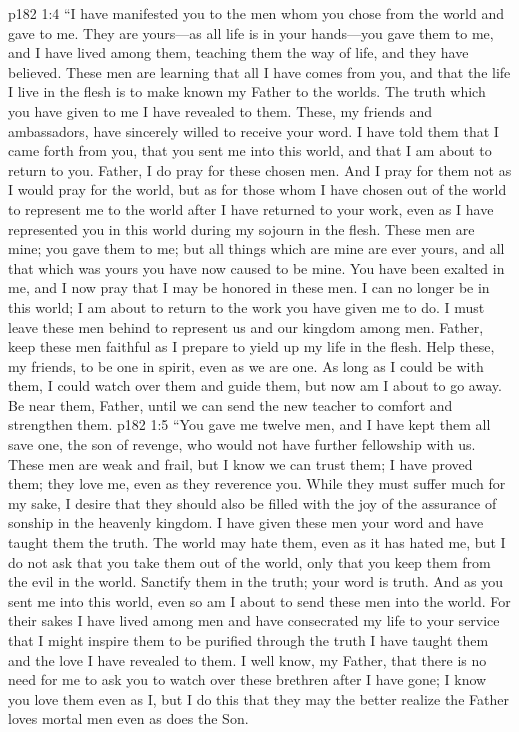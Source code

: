 \vs p182 1:4 \textcolor{ubdarkred}{“I have manifested you to the men whom you chose from the world and gave to me. They are yours---as all life is in your hands---you gave them to me, and I have lived among them, teaching them the way of life, and they have believed. These men are learning that all I have comes from you, and that the life I live in the flesh is to make known my Father to the worlds. The truth which you have given to me I have revealed to them. These, my friends and ambassadors, have sincerely willed to receive your word. I have told them that I came forth from you, that you sent me into this world, and that I am about to return to you. Father, I do pray for these chosen men. And I pray for them not as I would pray for the world, but as for those whom I have chosen out of the world to represent me to the world after I have returned to your work, even as I have represented you in this world during my sojourn in the flesh. These men are mine; you gave them to me; but all things which are mine are ever yours, and all that which was yours you have now caused to be mine. You have been exalted in me, and I now pray that I may be honored in these men. I can no longer be in this world; I am about to return to the work you have given me to do. I must leave these men behind to represent us and our kingdom among men. Father, keep these men faithful as I prepare to yield up my life in the flesh. Help these, my friends, to be one in spirit, even as we are one. As long as I could be with them, I could watch over them and guide them, but now am I about to go away. Be near them, Father, until we can send the new teacher to comfort and strengthen them.}\plusone
\vs p182 1:5 \textcolor{ubdarkred}{“You gave me twelve men, and I have kept them all save one, the son of revenge, who would not have further fellowship with us. These men are weak and frail, but I know we can trust them; I have proved them; they love me, even as they reverence you. While they must suffer much for my sake, I desire that they should also be filled with the joy of the assurance of sonship in the heavenly kingdom. I have given these men your word and have taught them the truth. The world may hate them, even as it has hated me, but I do not ask that you take them out of the world, only that you keep them from the evil in the world. Sanctify them in the truth; your word is truth. And as you sent me into this world, even so am I about to send these men into the world. For their sakes I have lived among men and have consecrated my life to your service that I might inspire them to be purified through the truth I have taught them and the love I have revealed to them. I well know, my Father, that there is no need for me to ask you to watch over these brethren after I have gone; I know you love them even as I, but I do this that they may the better realize the Father loves mortal men even as does the Son.}\plusone
